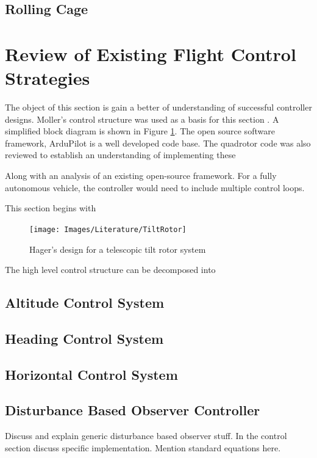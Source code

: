 	
	\subsection{Rolling Cage}
	
\section{Review of Existing Flight Control Strategies}\label{SECT_ControlReview}
The object of this section is gain a better of understanding of successful controller designs. Moller's control structure was used as a basis for this section \cite{Moller2015}. A simplified block diagram is shown in Figure \ref{IM_ControlOverviewSimplified}. The open source software framework, ArduPilot is a well developed code base. The quadrotor code was also reviewed to establish an understanding of implementing these 

 Along with an analysis of an existing open-source framework. For a fully autonomous vehicle, the controller would need to include multiple control loops.

This section begins with
\begin{figure}[H]
	\centering
	\texttt{[image: Images/Literature/TiltRotor]}     
	\caption{Hager's design for a telescopic tilt rotor system \cite{Heli}}
	\label{IM_ControlOverviewSimplified}
\end{figure}

The high level control structure can be decomposed into 
		
	\subsection{Altitude Control System}
	
	\subsection{Heading Control System}
	
	\subsection{Horizontal Control System}
	
	\subsection{Disturbance Based Observer Controller}\label{SectionDisturbanceObserver}
	Discuss and explain generic disturbance based observer stuff. In the control section discuss specific implementation. Mention standard equations here. 
	
